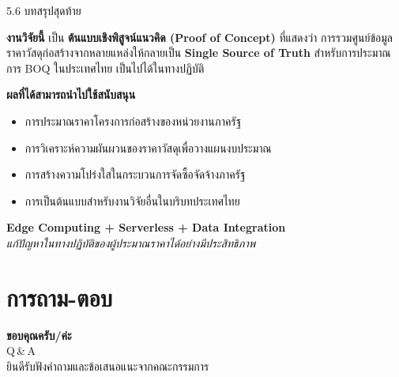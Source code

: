 \documentclass[aspectratio=169,11pt]{beamer}
\begin{document}
\begin{frame}{5.6 บทสรุปสุดท้าย}
  \begin{block}{\textbf{งานวิจัยนี้}}
    เป็น \textbf{ต้นแบบเชิงพิสูจน์แนวคิด (Proof of Concept)} ที่แสดงว่า
    การรวมศูนย์ข้อมูลราคาวัสดุก่อสร้างจากหลายแหล่งให้กลายเป็น
    \textbf{Single Source of Truth} สำหรับการประมาณการ BOQ ในประเทศไทย
    เป็นไปได้ในทางปฏิบัติ
  \end{block}
  \vspace{0.3em}
  \textbf{ผลที่ได้สามารถนำไปใช้สนับสนุน}
  \begin{itemize}
    \item การประมาณราคาโครงการก่อสร้างของหน่วยงานภาครัฐ
    \item การวิเคราะห์ความผันผวนของราคาวัสดุเพื่อวางแผนงบประมาณ
    \item การสร้างความโปร่งใสในกระบวนการจัดซื้อจัดจ้างภาครัฐ
    \item การเป็นต้นแบบสำหรับงานวิจัยอื่นในบริบทประเทศไทย
  \end{itemize}
  \vspace{0.3em}
  \begin{center}
    \textbf{Edge Computing + Serverless + Data Integration} \\
    \emph{แก้ปัญหาในทางปฏิบัติของผู้ประมาณราคาได้อย่างมีประสิทธิภาพ}
  \end{center}
\end{frame}

\section*{การถาม-ตอบ}
\begin{frame}
  \begin{center}
    \vspace{1cm}
    {\Huge \textbf{ขอบคุณครับ/ค่ะ}} \\[1cm]
    {\LARGE Q\,\&\,A} \\[1.5cm]
    {\large ยินดีรับฟังคำถามและข้อเสนอแนะจากคณะกรรมการ}
  \end{center}
\end{frame}
\end{document}
